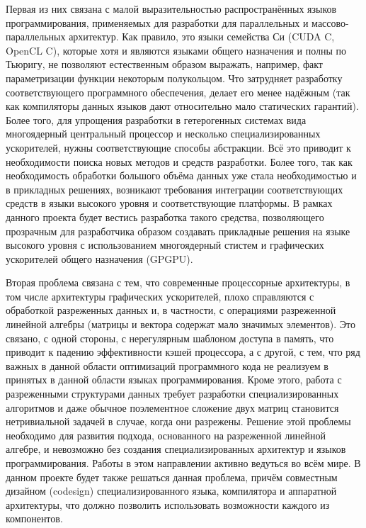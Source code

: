 \documentclass[12pt]{article}  %
\theoremstyle{remark}
\begin{document}
Первая из них связана с малой выразительностью распространённых языков программирования, применяемых для разработки для параллельных и массово-параллельных архитектур. Как правило, это языки семейства Си (CUDA C, OpenCL C), которые хотя и являются языками общего назначения и полны по Тьюригу, не позволяют естественным образом выражать, например, факт параметризации функции некоторым полукольцом. Что затрудняет разработку соответствующего программного обеспечения, делает его менее надёжным (так как компиляторы данных языков дают относительно мало статических гарантий). Более того, для упрощения разработки в гетерогенных системах вида многоядерный центральный процессор и несколько специализированных ускорителей, нужны соответствующие способы абстракции. Всё это приводит к необходимости поиска новых методов и средств разработки. Более того, так как необходимость обработки большого объёма данных уже стала необходимостью и в прикладных решениях, возникают требования интеграции соответствующих средств в языки высокого уровня и соответствующие платформы. В рамках данного проекта будет вестись разработка такого средства, позволяющего прозрачным для разработчика образом создавать прикладные решения на языке высокого уровня с использованием многоядерный стистем и графических ускорителей общего назначения (GPGPU).  

Вторая проблема связана с тем, что современные процессорные архитектуры, в том числе архитектуры графических ускорителей, плохо справляются с обработкой разреженных данных и, в частности, с операциями разреженной линейной алгебры (матрицы и вектора содержат мало значимых элементов). Это связано, с одной стороны, с нерегулярным шаблоном доступа в память, что приводит к падению эффективности кэшей процессора, а с другой, с тем, что ряд важных в данной области оптимизаций программного кода не реализуем в принятых в данной области языках программирования. Кроме этого, работа с разреженными структурами данных требует разработки специализированных алгоритмов и даже обычное поэлементное сложение двух матриц становится нетривиальной задачей в случае, когда они разрежены. Решение этой проблемы необходимо для развития подхода, основанного на разреженной линейной алгебре, и невозможно без создания специализированных архитектур и языков программирования. Работы в этом направлении активно ведуться во всём мире. В данном проекте будет также решаться данная проблема, причём совместным дизайном (codesign) специализированного языка, компилятора и аппаратной архитектуры, что должно позволить использовать возможности каждого из компонентов. 
\end{document}
